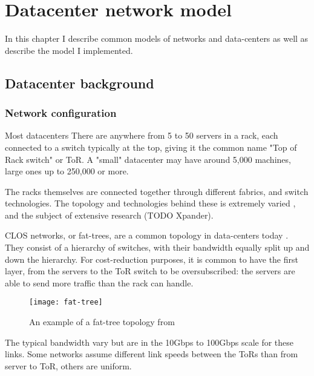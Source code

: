 \chapter{Datacenter network model} \label{model}

In this chapter I describe common models of networks and data-centers as well as describe the model I implemented.

\section{Datacenter background} \label{model-dc}

\subsection{Network configuration} \label{model-network}

Most datacenters \rotornet\cite{handley_re-architecting_2017}\opera
There are anywhere from 5 to 50 servers in a rack, each connected to a switch typically at the top, giving it the common name "Top of Rack switch" or ToR.
A "small" datacenter may have around 5,000 machines, large ones up to 250,000 or more. %

The racks themselves are connected together through different fabrics, and switch technologies.
The topology and technologies behind these is extremely varied \cite{kassing_beyond_2017}, and the subject of extensive research \opera\rotornet (TODO Xpander). %

CLOS networks, or fat-trees, are a common topology in data-centers today \cite{singh_jupiter_2015}\cite{noauthor_reinventing_2019}\cite{noauthor_introducing_2014}.
They consist of a hierarchy of switches, with their bandwidth equally split up and down the hierarchy.
For cost-reduction purposes, it is common to have the first layer, from the servers to the ToR switch to be oversubscribed: the servers are able to send more traffic than the rack can handle.

\begin{figure}[h]
    \centering
    \texttt{[image: fat-tree]}
    \label{fig:fat-tree}
    \caption{An example of a fat-tree topology from \cite{al-fares_scalable_2008}}
\end{figure}

The typical bandwidth vary but are in the 10Gbps to 100Gbps scale for these links.
Some networks assume different link speeds between the ToRs than from server to ToR, others are uniform.

